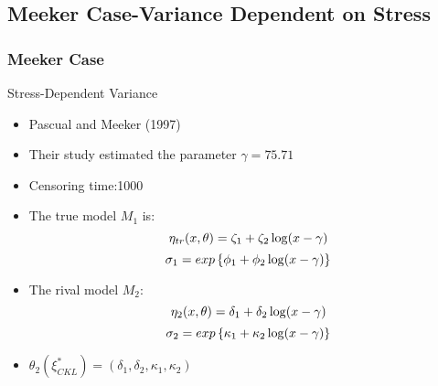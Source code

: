 \documentclass[xcolor=dvipsnames,aspectratio=1610]{beamer}
\begin{document}

\subsection{Meeker Case-Variance Dependent on Stress}
\begin{frame}
\frametitle{Meeker Case}
Stress-Dependent Variance
\begin{itemize}
\item Pascual and Meeker (1997)

\item Their study estimated the parameter $\gamma=75.71$

\item Censoring time:1000

\item The true model $M_1$ is:
\begin{equation}\notag
\eta_{tr}(x,\theta)=\zeta_1+\zeta_2\log(x-\gamma)
\end{equation}
\begin{equation}\notag
\sigma_1=exp\left\{\phi_1+\phi_2\log(x-\gamma)\right\}
\end{equation}
\item The rival model $M_2$: 
\begin{equation}\notag
\eta_2(x,\theta)=\delta_1+\delta_2\log(x-\gamma)
\end{equation}
\begin{equation}\notag
\sigma_2=exp\left\{\kappa_1+\kappa_2\log(x-\gamma)\right\}
\end{equation}
\item $\theta_2(\xi^*_{CKL})=(\delta_1,\delta_2,\kappa_1,\kappa_2)$

\end{itemize}


\end{frame}

\end{document}
